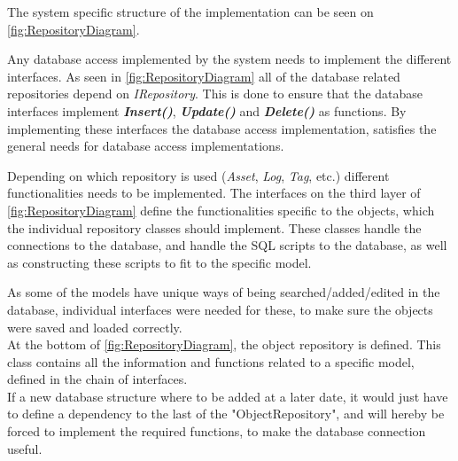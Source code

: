 The system specific structure of the implementation can be seen on \autoref{fig:RepositoryDiagram}.
\par
Any database access implemented by the system needs to implement the different interfaces. As seen in \autoref{fig:RepositoryDiagram} all of the database related repositories depend on \textit{IRepository}. This is done to ensure that the database interfaces implement \textbf{\textit{Insert()}}, \textbf{\textit{Update()}} and \textbf{\textit{Delete()}} as functions. By implementing these interfaces the database access implementation, satisfies the general needs for database access implementations.
\par
Depending on which repository is used (\textit{Asset}, \textit{Log}, \textit{Tag}, etc.) different functionalities needs to be implemented.
The interfaces on the third layer of \autoref{fig:RepositoryDiagram} define the functionalities specific to the objects, which the individual repository classes should implement. These classes handle the connections to the database, and handle the SQL scripts to the database, as well as constructing these scripts to fit to the specific model. 
\par
As some of the models have unique ways of being searched/added/edited in the database, individual interfaces were needed for these, to make sure the objects were saved and loaded correctly. 
\\
At the bottom of \autoref{fig:RepositoryDiagram}, the object repository is defined. This class contains all the information and functions related to a specific model, defined in the chain of interfaces.
\\
If a new database structure where to be added at a later date, it would just have to define a dependency to the last of the "ObjectRepository", and will hereby be forced to implement the required functions, to make the database connection useful.
